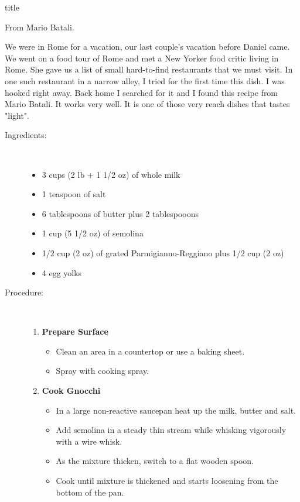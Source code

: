 \documentclass [11pt, letterpaper] {article}
\begin{document}
 {title}

\begin{flushright}
{From Mario Batali.}
\end{flushright}

We were in Rome for a vacation, our last couple's vacation before Daniel came. We went on a food tour of Rome and met a New Yorker food critic living in Rome. She gave us a list of small hard-to-find restaurants that we must visit. In one such restaurant in a narrow alley, I tried for the first time this dish. I was hooked right away. Back home I searched for it and I found this recipe from Mario Batali. It works very well. It is one of those very reach dishes that tastes "light".

\begin{description}

\item[Ingredients:]\ \\
	\begin{itemize}
	\item	3 cups  (2 lb + 1 1/2 oz) of whole milk
	\item 1 teaspoon of salt
	\item 6 tablespoons of butter plus 2 tablespooons
	\item 1 cup (5 1/2 oz) of semolina
	\item 1/2 cup (2 oz) of grated Parmigianno-Reggiano plus 1/2 cup (2 oz)
	\item 4 egg yolks
	\end{itemize}

\item[Procedure:]\ \\

	\begin{enumerate}
	\item {\bf Prepare Surface}
	\begin{itemize}
	\item Clean an area in a countertop or use a baking sheet. 
	\item Spray with cooking spray.
	\end{itemize}
	
	\item {\bf Cook Gnocchi }
	\begin{itemize}
	\item In a large non-reactive saucepan heat up the milk, butter and salt.
	\item Add semolina in a steady thin stream while whisking vigorously with a wire whisk.
	\item As the mixture thicken, switch to a flat wooden spoon. 
	\item Cook until mixture is thickened and starts loosening from the bottom of the pan.
	\end{itemize}


\end{enumerate}
\end{description}
\end{document}
